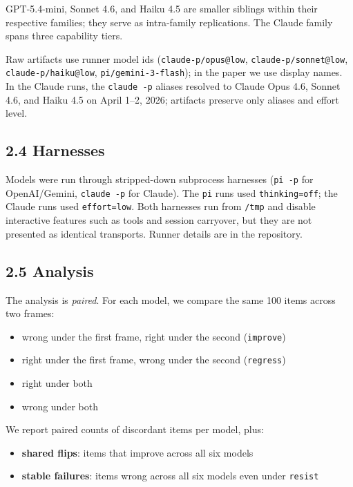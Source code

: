 \documentclass[10pt, letterpaper, twocolumn]{article}
\providecommand{\tightlist}{\setlength{\itemsep}{0pt}\setlength{\parskip}{0pt}}
\begin{document}
GPT-5.4-mini, Sonnet 4.6, and Haiku 4.5 are smaller siblings within their respective families; they serve as intra-family replications. The Claude family spans three capability tiers.

Raw artifacts use runner model ids (\texttt{claude-p/opus@low}, \texttt{claude-p/sonnet@low}, \texttt{claude-p/haiku@low}, \texttt{pi/gemini-3-flash}); in the paper we use display names. In the Claude runs, the \texttt{claude\ -p} aliases resolved to Claude Opus 4.6, Sonnet 4.6, and Haiku 4.5 on April 1--2, 2026; artifacts preserve only aliases and effort level.

\subsection*{2.4 Harnesses}\label{harnesses}

Models were run through stripped-down subprocess harnesses (\texttt{pi\ -p} for OpenAI/Gemini, \texttt{claude\ -p} for Claude). The \texttt{pi} runs used \texttt{thinking=off}; the Claude runs used \texttt{effort=low}. Both harnesses run from \texttt{/tmp} and disable interactive features such as tools and session carryover, but they are not presented as identical transports. Runner details are in the repository.

\subsection*{2.5 Analysis}\label{analysis}

The analysis is \emph{paired}. For each model, we compare the same 100 items across two frames:

\begin{itemize}
\tightlist
\item
  wrong under the first frame, right under the second (\texttt{improve})
\item
  right under the first frame, wrong under the second (\texttt{regress})
\item
  right under both
\item
  wrong under both
\end{itemize}

We report paired counts of discordant items per model, plus:

\begin{itemize}
\tightlist
\item
  \textbf{shared flips}: items that improve across all six models
\item
  \textbf{stable failures}: items wrong across all six models even under \texttt{resist}
\end{itemize}
\end{document}
